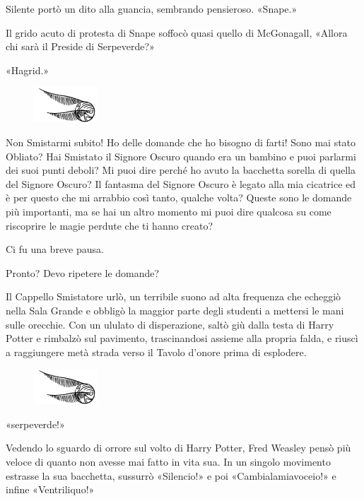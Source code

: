 Silente portò un dito alla guancia, sembrando pensieroso. «Snape.»

Il grido acuto di protesta di Snape soffocò quasi quello di McGonagall, «Allora chi sarà il Preside di Serpeverde?»

«Hagrid.»

\begin{figure}[h]
	\includegraphics[scale=0.4]{boccino.png}
	\centering
\end{figure}

Non Smistarmi subito! Ho delle domande che ho bisogno di farti! Sono mai stato Obliato? Hai Smistato il Signore Oscuro quando era un bambino e puoi parlarmi dei suoi punti deboli? Mi puoi dire perché ho avuto la bacchetta sorella di quella del Signore Oscuro? Il fantasma del Signore Oscuro è legato alla mia cicatrice ed è per questo che mi arrabbio così tanto, qualche volta? Queste sono le domande più importanti, ma se hai un altro momento mi puoi dire qualcosa su come riscoprire le magie perdute che ti hanno creato?

Ci fu una breve pausa.

Pronto? Devo ripetere le domande?

Il Cappello Smistatore urlò, un terribile suono ad alta frequenza che echeggiò nella Sala Grande e obbligò la maggior parte degli studenti a mettersi le mani sulle orecchie. Con un ululato di disperazione, saltò giù dalla testa di Harry Potter e rimbalzò sul pavimento, trascinandosi assieme alla propria falda, e riuscì a raggiungere metà strada verso il Tavolo d’onore prima di esplodere.

\begin{figure}[h]
	\includegraphics[scale=0.4]{boccino.png}
	\centering
\end{figure}

«serpeverde!»

Vedendo lo sguardo di orrore sul volto di Harry Potter, Fred Weasley pensò più veloce di quanto non avesse mai fatto in vita sua. In un singolo movimento estrasse la sua bacchetta, sussurrò «Silencio!» e poi «Cambialamiavoceio!» e infine «Ventriliquo!»

